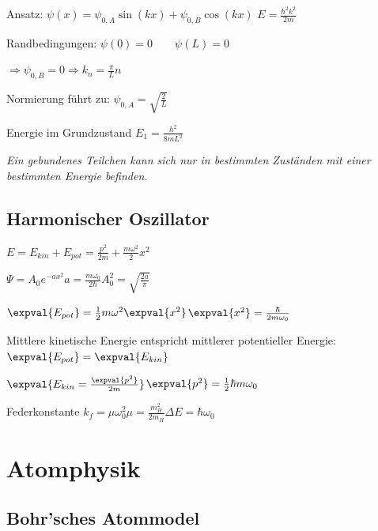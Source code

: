 \documentclass[10pt,a4paper]{scrartcl}
\begin{document}
\begin{multicols*}{3}
	\finn
	
	Ansatz: $\psi(x)=\psi_{0,A}\sin(kx)+\psi_{0,B}\cos(kx)$ \hfill$E=\frac{\hbar^2 k^2}{2m}$
	
	\finn	
	
	Randbedingungen: $\psi(0)=0\qquad\psi(L)=0$
	
	$\Rightarrow \psi_{0,B}=0\Longrightarrow k_n=\frac{\pi}{L}n$
	
	\finn
	
	Normierung führt zu: $\psi_{0,A}=\sqrt{\frac{2}{L}}$
	
	
	\begin{center}
	\vspace{1ex}
	\end{center}
	
	Energie im Grundzustand $E_1=\frac{h^2}{8mL^2}$
	\begin{center}
	\emph{Ein gebundenes Teilchen kann sich nur in bestimmten Zuständen mit einer bestimmten Energie befinden.}
	\end{center}

	\subsection*{Harmonischer Oszillator}
	
	$E=E_{kin}+E_{pot}=\frac{p^2}{2m}+\frac{m\omega^2}{2}x^2$
	
	$\Psi=A_0e^{-ax^2}$\hfill$a=\frac{m\omega_0}{2\hbar}$\hfill$A_0^2=\sqrt{\frac{2a}{\pi}}$
	
	$\expval{E_{pot}}=\frac{1}{2}m\omega^2\expval{x^2}$\hfill$\expval{x^2}=\frac{\hbar}{2m\omega_0}$
	
	\finn
	
	Mittlere kinetische Energie entspricht mittlerer potentieller Energie: $\expval{E_{pot}}=\expval{E_{kin}}$
	
	\finn
	
	$\expval{E_{kin}=\frac{\expval{p^2}}{2m}}$\hfill$\expval{p^2}=\frac{1}{2}\hbar m \omega_0$
	
	Federkonstante $k_f=\mu\omega_0^2$\hfill$\mu=\frac{m_H^2}{2m_H}$\hfill$\Delta E =\hbar\omega_0$

	\section{Atomphysik}
	
	\subsection{Bohr'sches Atommodel}	
	

\end{multicols*}
\end{document}
